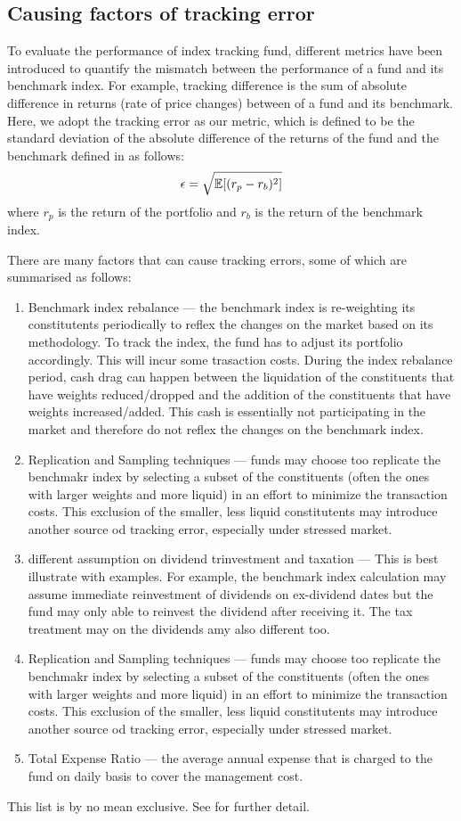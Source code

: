 \subsection{Causing factors of tracking error}
To evaluate the performance of index tracking fund, different metrics have been introduced to quantify the mismatch between the performance of a fund and its benchmark index. For example, tracking difference is the sum of absolute difference in returns (rate of price changes) between of a fund and its benchmark. Here, we adopt the tracking error as our metric, which is defined to be the standard deviation of the absolute difference of the returns of the fund and the benchmark defined in \cite{BJ13} as follows:
\begin{equation}
  \epsilon = \sqrt{\operatorname{\mathbb{E}}[(r_p - r_b)^2]}
\end{equation}
where $r_p$ is the return of the portfolio and $r_b$ is the return of the benchmark index.
 
There are many factors that can cause tracking errors, some of which are summarised as follows:
\begin{enumerate}
\item Benchmark index rebalance --- the benchmark index is re-weighting its constitutents periodically to reflex the changes on the market based on its methodology. To track the index, the fund has to adjust its portfolio accordingly. This will incur some trasaction costs. During the index rebalance period, cash drag can happen between the liquidation of the constituents that have weights reduced/dropped and the addition of the constituents that have weights increased/added. This cash is essentially not participating in the market and therefore do not reflex the changes on the benchmark index.
\item Replication and Sampling techniques --- funds may choose too replicate the benchmakr index by selecting a subset of the constituents (often the ones with larger weights and more liquid) in an effort to minimize the transaction costs. This exclusion of the smaller, less liquid constitutents may introduce another source od tracking error, especially under stressed market.
\item different assumption on dividend trinvestment and taxation --- This is best illustrate with examples. For example, the benchmark index calculation may assume immediate reinvestment of dividends on ex-dividend dates but the fund may only able to reinvest the dividend after receiving it. The tax treatment may on the dividends amy also different too.
\item Replication and Sampling techniques --- funds may choose too replicate the benchmakr index by selecting a subset of the constituents (often the ones with larger weights and more liquid) in an effort to minimize the transaction costs. This exclusion of the smaller, less liquid constitutents may introduce another source od tracking error, especially under stressed market.
\item Total Expense Ratio --- the average annual expense that is charged to the fund on daily basis to cover the management cost.
\end{enumerate}
This list is by no mean exclusive. See \cite{BJ13} for further detail.
 
